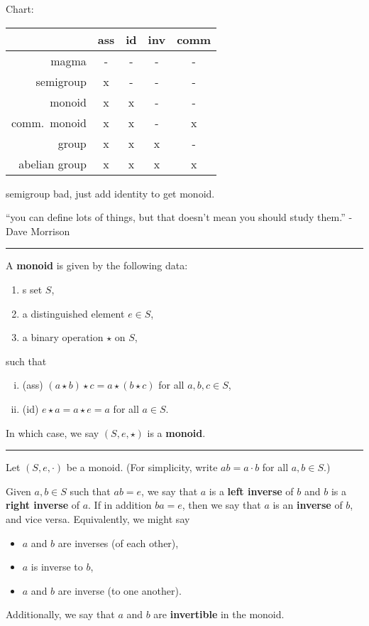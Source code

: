 \documentclass[12pt]{article}
\newcommand{\keyword}[1]{\textbf{#1}}
\newcommand{\sepline}{\rule{\textwidth}{0.4pt}}
\theoremstyle{definition}
\newcommand{\<}{\left\langle}
\renewcommand{\>}{\right\rangle}
\renewcommand{\_}[1]{{_{#1}}}
\begin{document}
Chart:
\begin{center}
    \begin{tabular}{r|cccc}
         & ass & id & inv & comm \\
            \hline
        magma & - & - & - & - \\
        semigroup & x & - & - & - \\
        monoid & x & x & - & - \\
        comm.\ monoid & x & x & - & x \\
        group & x & x & x & - \\
        abelian group & x & x & x & x \\
    \end{tabular}
\end{center}

semigroup bad, just add identity to get monoid.

``you can define lots of things, but that doesn't mean you should study them.'' - Dave Morrison

\sepline

A \keyword{monoid} is given by the following data:
\begin{enumerate}[(1)]
    \item s set $S$,
    \item a distinguished element $e \in S$,
    \item a binary operation $\star$ on $S$,
\end{enumerate}
such that
\begin{enumerate}[(i)]
    \item (ass) $(a \star b) \star c = a \star (b \star c)$ for all $a, b, c \in S$,
    \item (id) $e \star a = a \star e = a$ for all $a \in S$.
\end{enumerate}
In which case, we say $(S, e, \star)$ is a \keyword{monoid}.

\sepline

Let $(S, e, \cdot)$ be a monoid.
(For simplicity, write $ab = a \cdot b$ for all $a, b \in S$.)

Given $a, b \in S$ such that $ab = e$, we say that $a$ is a \keyword{left inverse} of $b$ and $b$ is a \keyword{right inverse} of $a$.
If in addition $ba = e$, then we say that $a$ is an \keyword{inverse} of $b$, and vice versa.
Equivalently, we might say
\begin{itemize}[nosep]
    \item $a$ and $b$ are inverses (of each other),
    \item $a$ is inverse to $b$,
    \item $a$ and $b$ are inverse (to one another).
\end{itemize}
Additionally, we say that $a$ and $b$ are \keyword{invertible} in the monoid.
\end{document}

